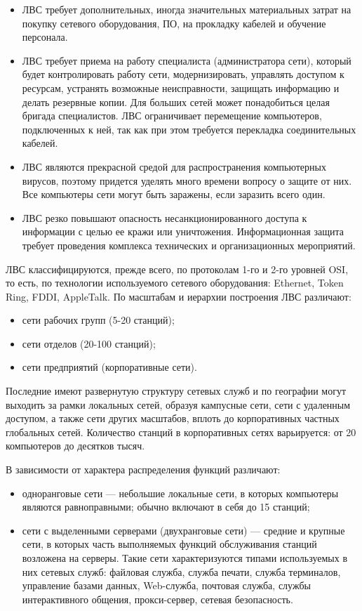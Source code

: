 \begin{itemize}
    \item ЛВС требует дополнительных, иногда значительных материальных затрат на
        покупку сетевого оборудования, ПО, на прокладку кабелей и обучение персонала. 
    \item ЛВС требует приема на работу специалиста (администратора сети),  который
        будет контролировать  работу сети, модернизировать, управлять доступом к
        ресурсам, устранять возможные неисправности, защищать информацию и делать
        резервные копии. Для больших сетей может понадобиться целая бригада
        специалистов. ЛВС ограничивает перемещение компьютеров, подключенных к ней, так
        как при этом требуется перекладка соединительных кабелей.
    \item ЛВС являются прекрасной средой для распространения компьютерных  вирусов,
        поэтому придется уделять  много  времени  вопросу о защите от них. Все
        компьютеры сети могут быть заражены, если заразить всего один.
    \item ЛВС резко повышают опасность несанкционированного доступа к информации с целью
        ее кражи или уничтожения. Информационная защита требует проведения комплекса
        технических и организационных мероприятий.
\end{itemize}

ЛВС классифицируются,  прежде  всего, по протоколам  1-го  и  2-го уровней OSI, то есть,
по технологии используемого сетевого оборудования: Ethernet, Token Ring, FDDI,
AppleTalk. По масштабам и иерархии построения ЛВС различают: 
\begin{itemize}
    \item сети рабочих групп (5-20 станций); 
    \item сети отделов (20-100 станций); 
    \item сети предприятий (корпоративные сети).
\end{itemize}

    
Последние имеют  развернутую структуру  сетевых  служб  и  по  географии могут выходить
за рамки локальных сетей, образуя кампусные сети, сети с удаленным доступом, а также
сети других масштабов, вплоть до корпоративных частных глобальных сетей. Количество
станций в корпоративных сетях варьируется: от 20 компьютеров до десятков тысяч.

В зависимости от характера распределения функций различают: 

\begin{itemize}
    \item одноранговые  сети — небольшие  локальные  сети,  в которых компьютеры являются
        равноправными; обычно включают в себя до 15 станций;

    \item сети с выделенными серверами (двухранговые сети) — средние и крупные сети, в
        которых часть выполняемых функций обслуживания станций возложена на серверы. Такие
        сети характеризуются типами  используемых в них сетевых служб: файловая служба,
        служба печати, служба терминалов, управление базами данных, Web-служба, почтовая
        служба, службы интерактивного общения, прокси-сервер, сетевая безопасность.
\end{itemize}

